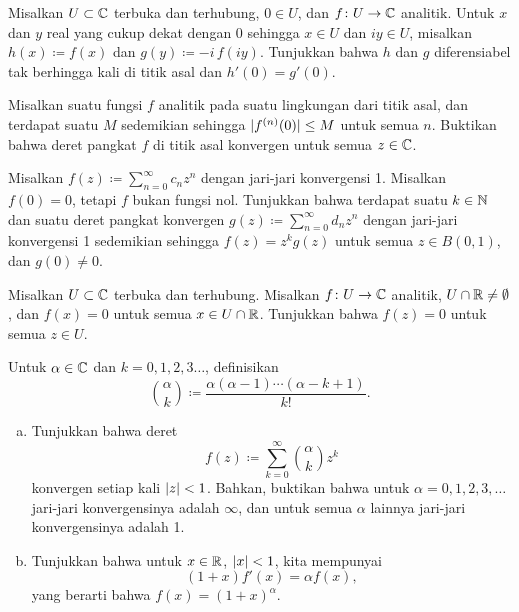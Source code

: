 \begin{exercise}
Misalkan $U \subset {\mathbb{C}}$ terbuka dan terhubung, $0 \in U$, dan $f \colon U
\to {\mathbb{C}}$ analitik.  Untuk $x$ dan $y$ real yang cukup dekat dengan $0$ sehingga
$x \in U$ dan $iy \in U$, misalkan $h(x) \coloneqq f(x)$ dan
$g(y) \coloneqq -i \, f(iy)$.
Tunjukkan bahwa $h$ dan $g$ diferensiabel tak berhingga kali di titik asal dan
$h'(0) = g'(0)$.
\end{exercise}

\begin{exercise}
Misalkan suatu fungsi $f$ analitik pada suatu lingkungan dari titik asal,
dan terdapat suatu $M$
sedemikian sehingga $\lvert {f^{(n)}(0)} \rvert \leq M$ untuk semua $n$.
Buktikan bahwa deret pangkat $f$ di titik asal konvergen untuk semua $z \in {\mathbb{C}}$.
\end{exercise}

\begin{exercise}
Misalkan $f(z) \coloneqq \sum_{n=0}^\infty c_n z^n$ dengan jari-jari konvergensi 1.  Misalkan $f(0)
= 0$, tetapi $f$ bukan fungsi nol.
Tunjukkan bahwa terdapat suatu $k \in {\mathbb{N}}$ dan suatu
deret pangkat konvergen $g(z) \coloneqq \sum_{n=0}^\infty d_n z^n$ dengan jari-jari konvergensi 1
sedemikian sehingga $f(z) = z^k g(z)$ untuk semua $z \in B(0,1)$, dan $g(0) \neq 0$.
\end{exercise}

\begin{exercise}
Misalkan $U \subset {\mathbb{C}}$ terbuka dan terhubung.  Misalkan
$f \colon U \to {\mathbb{C}}$ analitik, $U \cap {\mathbb{R}} \neq \emptyset$, dan
$f(x) = 0$ untuk semua $x \in U \cap {\mathbb{R}}$.  Tunjukkan bahwa $f(z) = 0$ untuk semua $z \in
U$.
\end{exercise}

\begin{exercise}
Untuk $\alpha \in {\mathbb{C}}$ dan $k=0,1,2,3\ldots$, definisikan
\begin{equation*}
\binom{\alpha}{k} \coloneqq \frac{\alpha(\alpha-1)\cdots(\alpha-k+1)}{k!} .
\end{equation*}
\begin{enumerate}[a)]
\item
Tunjukkan bahwa deret
\begin{equation*}
f(z) \coloneqq \sum_{k=0}^\infty \binom{\alpha}{k} z^k
\end{equation*}
konvergen setiap kali $\lvert {z} \rvert < 1$.
Bahkan, buktikan bahwa untuk $\alpha = 0,1,2,3,\ldots$ jari-jari
konvergensinya adalah $\infty$, dan untuk semua $\alpha$ lainnya
jari-jari konvergensinya adalah 1.
\item
Tunjukkan bahwa untuk $x \in {\mathbb{R}}$, $\lvert {x} \rvert < 1$, kita mempunyai
\begin{equation*}
(1+x) f'(x) = \alpha f(x) ,
\end{equation*}
yang berarti bahwa $f(x) = (1+x)^\alpha$.
\end{enumerate}
\end{exercise}

